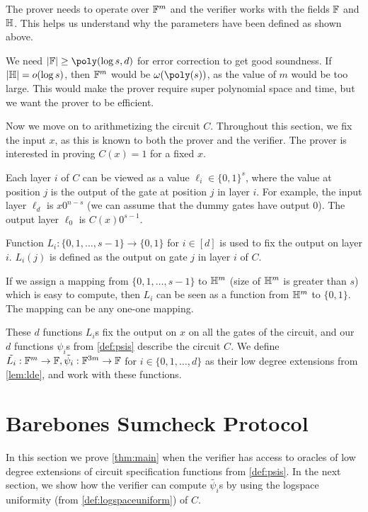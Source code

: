 The prover needs to operate over $\mathbb{F}^m$ and the verifier works with the fields
$\mathbb{F}$ and $\mathbb{H}$. This helps us understand why the parameters have been defined
as shown above.

We need $|\F| \geq \poly(\log s, d)$ for error correction to get good
soundness. If $|\mathbb{H}| = o(\log s)$, then $\mathbb{F}^m$ would be $\omega(\poly(s))$, as
the value of $m$ would be too large. This would make the prover require super
polynomial space and time, but we want the prover to be efficient.

Now we move on to arithmetizing the circuit $C$. Throughout this section, we
fix the input $x$, as this is known to both the prover and the verifier. The
prover is interested in proving $C(x)=1$ for a fixed $x$.

Each layer $i$ of $C$ can be viewed as a value $\ell_i \in \{0,1\}^{s}$, where
the value at position $j$ is the output of the gate at position $j$ in layer
$i$. For example, the input layer $\ell_d$ is $x0^{n-s}$ (we can assume that
the dummy gates have output 0). The output layer $\ell_0$ is $C(x)0^{s-1}$.

Function $L_i:\{0,1, \ldots, s-1\} \rightarrow \{0,1\}$ for $i \in [d]$ is used
to fix the output on layer $i$. $L_i(j)$ is defined as the output on gate $j$
in layer $i$ of $C$.

If we assign a mapping from $\{0,1, \ldots, s-1\}$ to $\mathbb{H}^m$ (size of $\mathbb{H}^m$
is greater than $s$) which is easy to compute, then $L_i$ can be seen as a
function from $\mathbb{H}^m$ to $\{0,1\}$. The mapping can be any one-one mapping.

These $d$ functions $L_i$s fix the output on $x$ on all the gates of the
circuit, and our $d$ functions $\psi_i$s from \cref{def:psis} describe the
circuit $C$. We define $\tilde{L_i}: \mathbb{F}^m \rightarrow \mathbb{F}, \tilde{\psi_i}:
\mathbb{F}^{3m} \rightarrow \mathbb{F}$ for $i\in \{0,1,\ldots, d\}$ as their low degree
extensions from \cref{lem:lde}, and work with these functions.

\section{Barebones Sumcheck Protocol}

In this section we prove \cref{thm:main} when the verifier has access to
oracles of low degree extensions of circuit specification functions from
\cref{def:psis}. In the next section, we show how the verifier can compute
$\tilde{\psi_i}$s by using the logspace uniformity (from
\cref{def:logspaceuniform}) of $C$.

